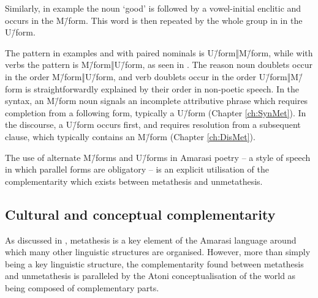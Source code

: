 Similarly, in example  the noun  `good'
is followed by a vowel-initial enclitic and occurs in the M\=/form.
This word is then repeated by the whole group in  in the U\=/form.

\begin{exe}
	\label{ex:140726 2}
	\begin{xlist}
		\label{ex:areokt}
		\label{ex:arekot}
	\end{xlist}
\end{exe}

The pattern in examples  and 
with paired nominals is U\=/form‖M\=/form, while with verbs
the pattern is M\=/form‖U\=/form, as seen in .
The reason noun doublets occur in the order M\=/form‖U\=/form,
and verb doublets occur in the order U\=/form‖M\=/form
is straightforwardly explained by their order in non-poetic speech.
In the syntax, an M\=/form noun signals an incomplete attributive
phrase which requires completion from a following form, typically a U\=/form (Chapter \ref{ch:SynMet}).
In the discourse, a U\=/form occurs first, and requires resolution
from a subsequent clause, which typically contains an M\=/form (Chapter \ref{ch:DisMet}).

The use of alternate M\=/forms and U\=/forms in Amarasi poetry
-- a style of speech in which parallel forms are obligatory --
is an explicit utilisation of the complementarity which
exists between metathesis and unmetathesis.

\subsection{Cultural and conceptual complementarity}
As discussed in , metathesis is a key
element of the Amarasi language around which many other linguistic structures are organised.
However, more than simply being a key linguistic structure,
the complementarity found between metathesis and unmetathesis
is paralleled by the Atoni conceptualisation of the world
as being composed of complementary parts.

